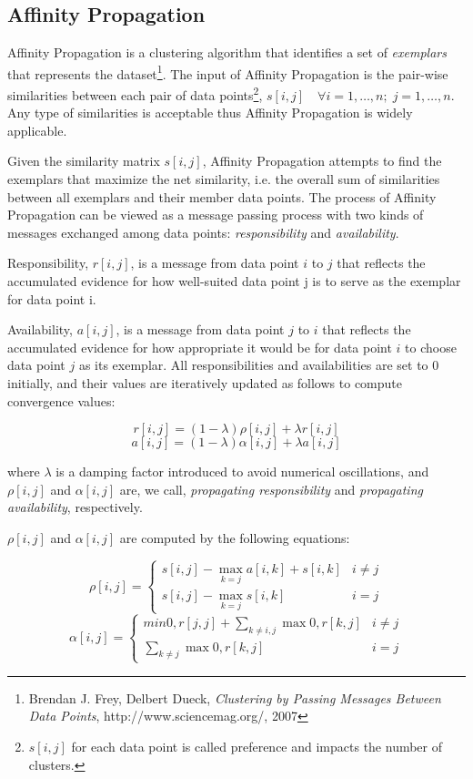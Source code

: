 \subsection{Affinity Propagation}

Affinity Propagation is a clustering algorithm that identifies a set of \textit{exemplars} that represents the dataset\footnote{Brendan J. Frey, Delbert Dueck, \emph{Clustering by Passing Messages
Between Data Points}, http://www.sciencemag.org/, 2007}. The input of Affinity Propagation is the pair-wise similarities between each pair of data points\footnote{$s[i,j]$ for each data point is called preference and impacts the number of clusters.}, $s[i, j] \quad \forall  i = 1, \ldots, n;\; j = 1, \ldots, n$. Any type of similarities is acceptable thus Affinity Propagation is widely applicable.

Given the similarity matrix $s[i, j]$, Affinity Propagation attempts to find the exemplars that maximize the net similarity, i.e. the overall sum of similarities between all exemplars and their member data points. The process of Affinity Propagation can be viewed as a message passing process with two
kinds of messages exchanged among data points: \emph{responsibility} and \emph{availability}. 

Responsibility, $r[i, j]$, is a message from data point $i$ to $j$ that reflects the accumulated evidence for how well-suited data point j is to serve as the exemplar for data point i. 

Availability, $a[i, j]$, is a message from data point $j$ to $i$ that reflects the accumulated evidence for how appropriate it would be for data point $i$ to choose data point $j$ as
its exemplar. All responsibilities and availabilities are set to $0$ initially, and their values are iteratively updated as follows to compute convergence values:

$$r[i, j] = (1-\lambda)\rho [i, j] + \lambda r[i, j]$$
$$a[i, j] = (1 -\lambda) \alpha[i, j] + \lambda a[i, j]$$

where $\lambda$ is a damping factor introduced to avoid numerical oscillations, and $\rho[i, j]$ and $\alpha[i, j]$ are, we call, \emph{propagating responsibility} and \emph{propagating availability}, respectively. 

$\rho[i, j]$ and $\alpha[i, j]$ are computed by the following equations:

$$
\rho[i, j] =
\left\{
\begin{array}{lr}
s[i, j] − \max_{k=j}a[i, k] + s[i, k] & i \neq j\\
s[i, j] − \max_{k=j}s[i, k]  &  i= j 
\end{array}
\right.
$$
$$
\alpha[i, j] =
\left\{
\begin{array}{lr}
min{0, r[j, j] + \sum_{k \neq i, j} \max 0, r[k, j]} & i \neq j\\
\sum_{k\neq j} \max {0, r[k, j]}  &  i= j 
\end{array}
\right.
$$

